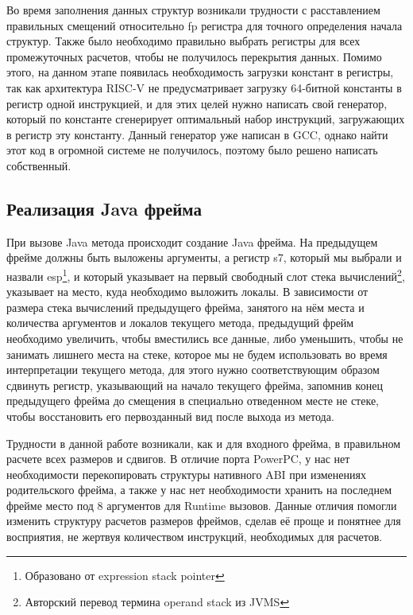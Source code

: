  
Во время заполнения данных структур возникали трудности с расставлением правильных смещений относительно fp регистра для точного определения начала структур. Также было необходимо правильно выбрать регистры для всех промежуточных расчетов, чтобы не получилось перекрытия данных. Помимо этого, на данном этапе появилась необходимость загрузки констант в регистры, так как архитектура RISC-V не предусматривает загрузку 64-битной константы в регистр одной инструкцией, и для этих целей нужно написать свой генератор, который по константе сгенерирует оптимальный набор инструкций, загружающих в регистр эту константу. Данный генератор уже написан в GCC, однако найти этот код в огромной системе не получилось, поэтому было решено написать собственный.





\subsection{Реализация Java фрейма}
При вызове Java метода происходит создание Java фрейма. На предыдущем фрейме должны быть выложены аргументы, а регистр s7, который мы выбрали и назвали esp\footnote{Образовано от expression stack pointer}, и который указывает на первый свободный слот стека вычислений\footnote{Авторский перевод термина operand stack из JVMS}, указывает на место, куда необходимо выложить локалы. В зависимости от размера стека вычислений предыдущего фрейма, занятого на нём места и количества аргументов и локалов текущего метода, предыдущий фрейм необходимо увеличить, чтобы вместились все данные, либо уменьшить, чтобы не занимать лишнего места на стеке, которое мы не будем использовать во время интерпретации текущего метода, для этого нужно соответствующим образом сдвинуть регистр, указывающий на начало текущего фрейма, запомнив конец предыдущего фрейма до смещения в специально отведенном месте не стеке, чтобы восстановить его первозданный вид после выхода из метода.

Трудности в данной работе возникали, как и для входного фрейма, в правильном расчете всех размеров и сдвигов. В отличие порта PowerPC, у нас нет необходимости перекопировать структуры нативного ABI при изменениях родительского фрейма, а также у нас нет необходимости хранить на последнем фрейме место под 8 аргументов для Runtime вызовов. Данные отличия помогли изменить структуру расчетов размеров фреймов, сделав её проще и понятнее для восприятия, не жертвуя количеством инструкций, необходимых для расчетов.

